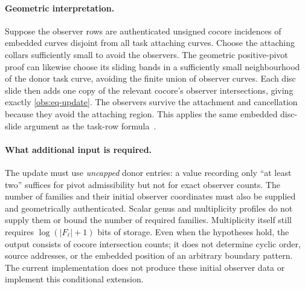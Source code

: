 \paragraph{Geometric interpretation.}
Suppose the observer rows are authenticated unsigned cocore
incidences of embedded curves disjoint from all task attaching
curves.  Choose the attaching collars sufficiently small to avoid
the observers.  The geometric positive-pivot proof can likewise
choose its sliding bands in a sufficiently small neighbourhood of
the donor task curve, avoiding the finite union of observer curves.  Each disc
slide then adds one copy of the relevant cocore's observer
intersections, giving exactly \eqref{obs:eq-update}.  The observers
survive the attachment and cancellation because they avoid the
attaching region.  This applies the same embedded disc-slide
argument as the task-row formula~\cite{marked-parallelity-85}.

\paragraph{What additional input is required.}
The update must use \emph{uncapped} donor entries: a value recording
only ``at least two'' suffices for pivot admissibility but not for
exact observer counts.  The number of families and their initial
observer coordinates must also be supplied and geometrically
authenticated.  Scalar genus and multiplicity profiles do not
supply them or bound the number of required families.  Multiplicity
itself still requires $\log(|F_\ell|+1)$ bits of storage.  Even when
the hypotheses hold, the output consists of cocore intersection
counts; it does not determine cyclic order, source addresses, or
the embedded position of an arbitrary boundary pattern.  The
current implementation does not produce these initial observer
data or implement this conditional extension.
